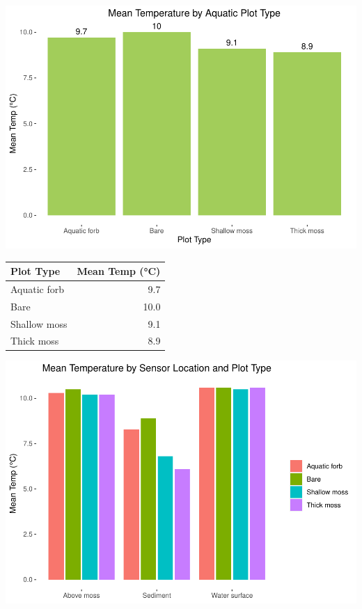 \documentclass[
]{article}
\begin{document}
\includegraphics{iButtons2022-2-17_files/figure-latex/unnamed-chunk-14-1.pdf}

\begin{longtable}[]{@{}lr@{}}
\toprule
Plot Type & Mean Temp (°C) \\
\midrule
\endhead
Aquatic forb & 9.7 \\
Bare & 10.0 \\
Shallow moss & 9.1 \\
Thick moss & 8.9 \\
\bottomrule
\end{longtable}

\includegraphics{iButtons2022-2-17_files/figure-latex/unnamed-chunk-15-1.pdf}
\end{document}

